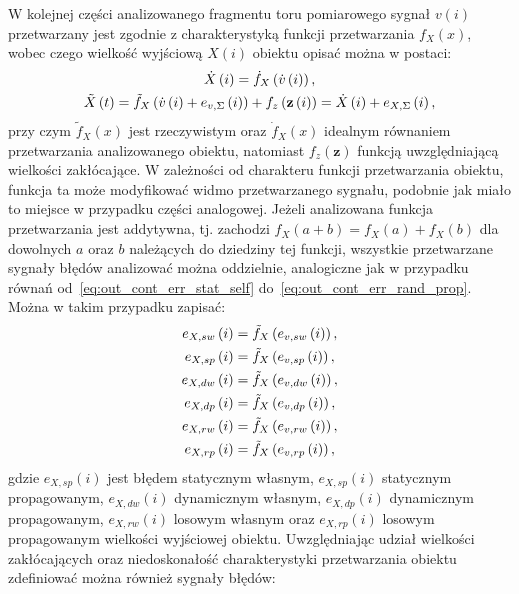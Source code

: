 W kolejnej części analizowanego fragmentu toru pomiarowego sygnał $v(i)$ przetwarzany jest zgodnie z charakterystyką funkcji przetwarzania $f_{X}(x)$, wobec czego wielkość wyjściową $X(i)$ obiektu opisać można w postaci:
\begin{gather}
\dot{X} \left(i\right) = \dot{f}_{X} \left( \dot{v} \left(i\right) \right) \label{eq:out_disc_ideal_all}, \\
\tilde{X} \left(t\right) = \tilde{f}_{X} \left( \dot{v} \left(i\right) + e_{v,\Sigma} \left(i\right) \right) + f_{z} \left(\mathbf{z} \left(i\right)\right) = \dot{X} \left(i\right) + e_{X,\Sigma} \left(i\right) \label{eq:out_disc_real_all},
\end{gather}
przy czym $\tilde{f}_{X}(x)$ jest rzeczywistym oraz $\dot{f}_{X}(x)$ idealnym równaniem przetwarzania analizowanego obiektu, natomiast $f_{z}(\mathbf{z})$ funkcją uwzględniającą wielkości zakłócające. W zależności od charakteru funkcji przetwarzania obiektu, funkcja ta może modyfikować widmo przetwarzanego sygnału, podobnie jak miało to miejsce w przypadku części analogowej. Jeżeli analizowana funkcja przetwarzania jest addytywna, tj. zachodzi $f_{X}(a + b) = f_{X}(a) + f_{X}(b)$ dla dowolnych $a$ oraz $b$ należących do dziedziny tej funkcji, wszystkie przetwarzane sygnały błędów analizować można oddzielnie, analogiczne jak w przypadku równań od~\eqref{eq:out_cont_err_stat_self} do~\eqref{eq:out_cont_err_rand_prop}. Można w takim przypadku zapisać:
\begin{gather}
e_{X,sw} \left(i\right) = \tilde{f}_{X} \left( e_{v,sw} \left(i\right) \right) \label{eq:out_disc_err_stat_self}, \\
e_{X,sp} \left(i\right) = \tilde{f}_{X} \left( e_{v,sp} \left(i\right) \right) \label{eq:out_disc_err_stat_prop}, \\
e_{X,dw} \left(i\right) = \tilde{f}_{X} \left( e_{v,dw} \left(i\right) \right) \label{eq:out_disc_err_dyn_self}, \\
e_{X,dp} \left(i\right) = \tilde{f}_{X} \left( e_{v,dp} \left(i\right) \right) \label{eq:out_disc_err_dyn_prop}, \\
e_{X,rw} \left(i\right) = \tilde{f}_{X} \left( e_{v,rw} \left(i\right) \right) \label{eq:out_disc_err_rand_self}, \\
e_{X,rp} \left(i\right) = \tilde{f}_{X} \left( e_{v,rp} \left(i\right) \right) \label{eq:out_disc_err_rand_prop},
\end{gather}
gdzie $e_{X,sp}(i)$ jest błędem statycznym własnym, $e_{X,sp}(i)$ statycznym propagowanym, $e_{X,dw}(i)$ dynamicznym własnym, $e_{X,dp}(i)$ dynamicznym propagowanym, $e_{X,rw}(i)$ losowym własnym oraz $e_{X,rp}(i)$ losowym propagowanym wielkości wyjściowej obiektu. Uwzględniając udział wielkości zakłócających oraz niedoskonałość charakterystyki przetwarzania obiektu zdefiniować można również sygnały błędów:

